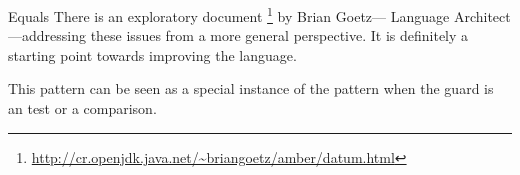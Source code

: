 \begin{pattern}{Equals}
There is an exploratory document%
\footnote{\url{http://cr.openjdk.java.net/\~briangoetz/amber/datum.html}}
by Brian Goetz---\java{} Language Architect---addressing these issues from a more general perspective.
It is definitely a starting point towards improving the \java{} language.

This pattern can be seen as a special instance of the  pattern when the guard is an  test or a  comparison.

\end{pattern}